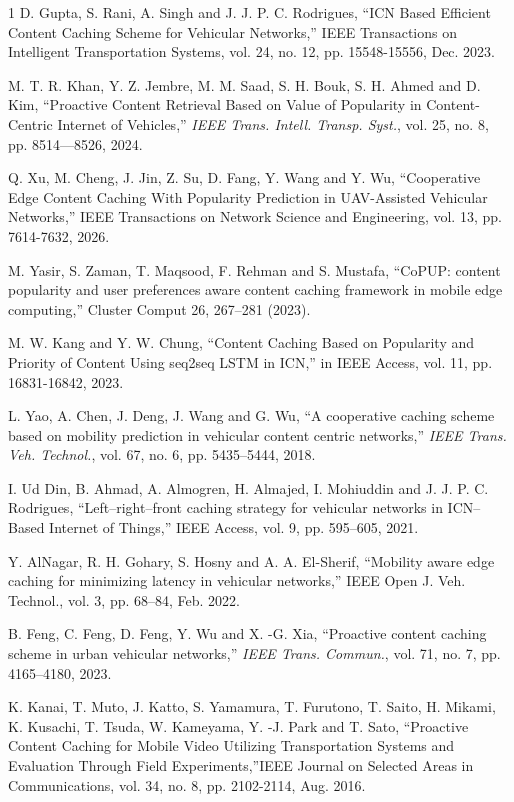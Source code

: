\begin{thebibliography}{1}
D. Gupta, S. Rani, A. Singh and J. J. P. C. Rodrigues, ``ICN Based Efficient Content Caching Scheme for Vehicular Networks,'' IEEE Transactions on Intelligent Transportation Systems, vol. 24, no. 12, pp. 15548-15556, Dec. 2023.


M. T. R. Khan, Y. Z. Jembre, M. M. Saad, S. H. Bouk, S. H. Ahmed and D. Kim, ``Proactive Content Retrieval Based on Value of Popularity in Content-Centric Internet of Vehicles,'' \emph{IEEE Trans. Intell. Transp. Syst.}, vol. 25, no. 8, pp. 8514—8526, 2024.



Q. Xu, M. Cheng, J. Jin, Z. Su, D. Fang, Y. Wang and Y. Wu, ``Cooperative Edge Content Caching With Popularity Prediction in UAV-Assisted Vehicular Networks,'' IEEE Transactions on Network Science and Engineering, vol. 13, pp. 7614-7632, 2026.


M. Yasir, S. Zaman, T. Maqsood, F. Rehman and S. Mustafa, ``CoPUP: content popularity and user preferences aware content caching framework in mobile edge computing,'' Cluster Comput 26, 267–281 (2023).


M. W. Kang and Y. W. Chung, ``Content Caching Based on Popularity and Priority of Content Using seq2seq LSTM in ICN,'' in IEEE Access, vol. 11, pp. 16831-16842, 2023.


L. Yao, A. Chen, J. Deng, J. Wang and G. Wu, ``A cooperative caching scheme based on mobility prediction in vehicular content centric networks,'' \emph{IEEE Trans. Veh. Technol.}, vol. 67, no. 6, pp. 5435–5444, 2018.

I. Ud Din, B. Ahmad, A. Almogren, H. Almajed, I. Mohiuddin and J. J. P. C. Rodrigues, ``Left–right–front caching strategy for vehicular networks in ICN–Based Internet of Things,'' IEEE Access, vol. 9, pp. 595–605, 2021.

Y. AlNagar, R. H. Gohary, S. Hosny and A. A. El-Sherif, ``Mobility aware edge caching for minimizing latency in vehicular networks,'' IEEE Open J. Veh. Technol., vol. 3, pp. 68–84, Feb. 2022.

B. Feng, C. Feng, D. Feng, Y. Wu and X. -G. Xia, ``Proactive content caching scheme in urban vehicular networks,'' \emph{IEEE Trans. Commun.}, vol. 71, no. 7, pp. 4165–4180, 2023.

K. Kanai, T. Muto, J. Katto, S. Yamamura, T. Furutono, T. Saito, H. Mikami, K. Kusachi, T. Tsuda, W. Kameyama, Y. -J. Park and T. Sato, ``Proactive Content Caching for Mobile Video Utilizing Transportation Systems and Evaluation Through Field Experiments,''IEEE Journal on Selected Areas in Communications, vol. 34, no. 8, pp. 2102-2114, Aug. 2016.



\end{thebibliography}
